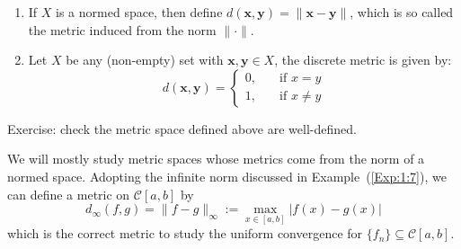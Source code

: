 \begin{example}
\begin{enumerate}
\item
If $X$ is a normed space, then define $d(\bm x,\bm y)=\|\bm x-\bm y\|$, which is so called the metric induced from the norm $\|\cdot\|$.
\item
Let $X$ be any (non-empty) set with $\bm x,\bm y\in X$, the discrete metric is given by:
\[
d(\bm x,\bm y)=\left\{
\begin{aligned}
0,&\quad\mbox{if }x=y\\
1,&\quad\mbox{if }x\ne y
\end{aligned}
\right.
\]
\end{enumerate}
Exercise: check the metric space defined above are well-defined.
\end{example}
\begin{remark}
We will mostly study metric spaces whose metrics come from the norm of a normed space.
Adopting the infinite norm discussed in Example~(\ref{Exp:1:7}), we can define a metric on $\mathcal{C}[a,b]$ by
\[
d_\infty(f,g)=\|f-g\|_\infty:=\max_{x\in[a,b]}|f(x)-g(x)|
\]
which is the correct metric to study the uniform convergence for $\{f_n\}\subseteq\mathcal{C}[a,b]$.
\end{remark}

